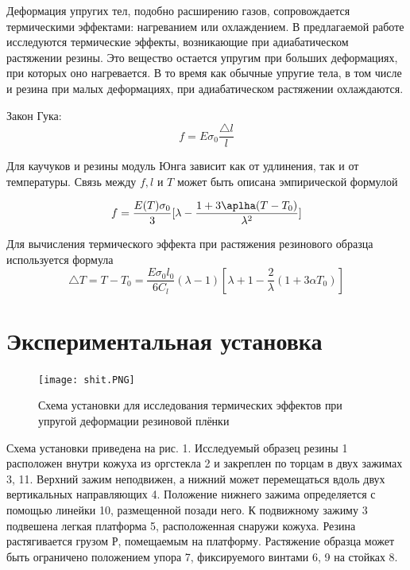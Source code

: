 \documentclass[a4paper]{article}
\begin{document}
Деформация упругих тел, подобно расширению газов, сопровождается термическими эффектами: нагреванием или охлаждением. В предлагаемой работе исследуются термические эффекты, возникающие при адиабатическом растяжении резины. Это вещество остается упругим при больших деформациях, при которых оно нагревается. В то время как обычные упругие тела, в том числе и резина при малых деформациях, при адиабатическом растяжении охлаждаются.

Закон Гука:
\begin{equation}
f = E \sigma_0 \frac{\triangle l}{l}
\end{equation}

Для каучуков и резины модуль Юнга зависит как от удлинения, так и от температуры. Связь между $f, l$ и $T$ может быть описана эмпирической формулой

\begin{equation}
f = \frac{E(T)\sigma_0}{3}[\lambda - \frac{1 + 3 \aplha (T-T_0)}{\lambda^2}]
\end{equation}

Для вычисления термического эффекта при растяжения резинового образца используется формула
\begin{equation}
\triangle T = T - T_0 = \frac{E\sigma_0 l_0}{6C_l}(\lambda - 1)[\lambda + 1 - \frac{2}{\lambda}(1 + 3\alpha T_0)]
\end{equation}


\section{Экспериментальная установка}

\begin{figure}[h]
    \centering
    \texttt{[image: shit.PNG]}
    \caption{Схема установки для исследования термических эффектов при упругой деформации резиновой плёнки}
    \label{fig:vac}
\end{figure}

Схема установки приведена на рис. 1. Исследуемый образец резины 1 расположен внутри кожуха из оргстекла 2 и закреплен по торцам в двух зажимах 3, 11. Верхний зажим неподвижен, а нижний может перемещаться вдоль двух вертикальных направляющих 4. Положение нижнего зажима определяется с помощью линейки 10, размещенной позади него. К подвижному
зажиму 3 подвешена легкая платформа 5, расположенная снаружи кожуха. Резина растягивается грузом Р, помещаемым на платформу. Растяжение образца может быть ограничено положением упора 7, фиксируемого винтами 6, 9 на стойках 8.
\end{document}
